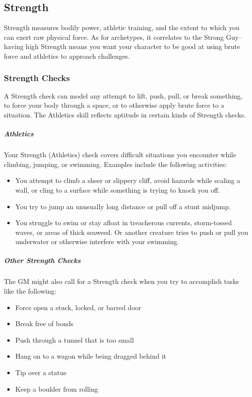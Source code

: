 \subsection{Strength}

Strength measures bodily power, athletic training, and the extent to which you can exert raw physical force. As for archetypes, it correlates to the Strong Guy--having high Strength means you want your character to be good at using brute force and athletics to approach challenges.

\subsubsection{Strength Checks}

A Strength check can model any attempt to lift, push, pull, or break something, to force your body through a space, or to otherwise apply brute force to a situation. The Athletics skill reflects aptitude in certain kinds of Strength checks.

\subparagraph*{Athletics} Your Strength (Athletics) check covers difficult situations you encounter while climbing, jumping, or swimming. Examples include the following activities:

\begin{itemize}
\item You attempt to climb a sheer or slippery cliff, avoid hazards while scaling a wall, or cling to a surface while something is trying to knock you off.
\item You try to jump an unusually long distance or pull off a stunt midjump.
\item You struggle to swim or stay afloat in treacherous currents, storm-tossed waves, or areas of thick seaweed. Or another creature tries to push or pull you underwater or otherwise interfere with your swimming.
\end{itemize}

\subparagraph*{Other Strength Checks} The GM might also call for a Strength check when you try to accomplish tasks like the following:

\begin{itemize}
\item Force open a stuck, locked, or barred door
\item Break free of bonds
\item Push through a tunnel that is too small
\item Hang on to a wagon while being dragged behind it
\item Tip over a statue
\item Keep a boulder from rolling
\end{itemize}

